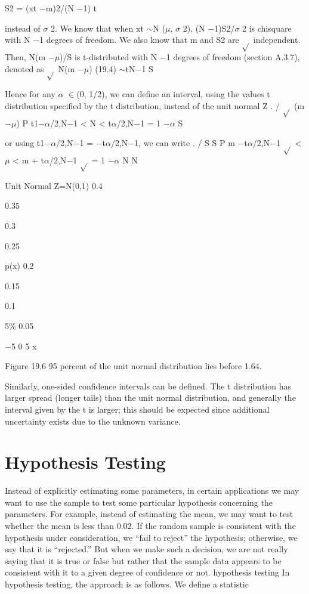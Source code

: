 S2 = (xt $-$m)2/(N $-$1) t

instead of $\sigma$ 2. We know that when xt $\sim$N ($\mu$, $\sigma$ 2), (N $-$1)S2/$\sigma$ 2 is chisquare with N $-$1 degrees of freedom. We also know that m and S2 are $\sqrt{}$ independent. Then, N(m $-$$\mu$)/S is t-distributed with N $-$1 degrees of freedom (section A.3.7), denoted as $\sqrt{}$ N(m $-$$\mu$) (19.4) $\sim$tN$-$1 S

Hence for any $\alpha$ $\in$(0, 1/2), we can define an interval, using the values t distribution specified by the t distribution, instead of the unit normal Z . / $\sqrt{}$ (m $-$$\mu$) P t1$-$$\alpha$/2,N$-$1 < N < t$\alpha$/2,N$-$1 = 1 $-$$\alpha$ S

or using t1$-$$\alpha$/2,N$-$1 = $-$t$\alpha$/2,N$-$1, we can write . / S S P m $-$t$\alpha$/2,N$-$1 $\sqrt{}$ < $\mu$ < m + t$\alpha$/2,N$-$1 $\sqrt{}$ = 1 $-$$\alpha$ N N

Unit Normal Z=N(0,1) 0.4

0.35

0.3

0.25

p(x) 0.2

0.15

0.1

5\% 0.05

$-$5 0 5 x

Figure 19.6 95 percent of the unit normal distribution lies before 1.64.

Similarly, one-sided confidence intervals can be defined. The t distribution has larger spread (longer tails) than the unit normal distribution, and generally the interval given by the t is larger; this should be expected since additional uncertainty exists due to the unknown variance.

\section{Hypothesis Testing}

Instead of explicitly estimating some parameters, in certain applications we may want to use the sample to test some particular hypothesis concerning the parameters. For example, instead of estimating the mean, we may want to test whether the mean is less than 0.02. If the random sample is consistent with the hypothesis under consideration, we “fail to reject” the hypothesis; otherwise, we say that it is “rejected.” But when we make such a decision, we are not really saying that it is true or false but rather that the sample data appears to be consistent with it to a given degree of confidence or not. hypothesis testing In hypothesis testing, the approach is as follows. We define a statistic

